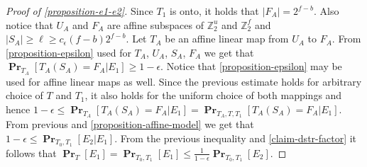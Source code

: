 \documentclass[unicode,review]{siamart1116}
\newcommand{\vecspace}[2]{\mathbb{Z}_{#1}^{#2}}
\newcommand{\binvecspace}[1]{\vecspace{2}{#1}}
\newcommand{\probs}[2]{\operatorname{\mathbf{Pr}}_{{#1}}\left[{#2}\right]}
\numberwithin{theorem}{section}
\begin{document}
\begin{appendix}
\begin{proof}[Proof of \cref{proposition-e1-e2}]
Since $T_1$ is onto, it holds that $|F_A| = 2^{f-b}$.
Also notice that $U_A$ and $F_A$ are affine subspaces of $\binvecspace{u}$ and $\binvecspace{f}$ and $|S_A| \geq \ell \geq c_\epsilon (f - b)2^{f-b}$.
Let $T_A$ be an affine linear map from $U_A$ to $F_A$.
From \cref{proposition-epsilon} used for $T_A$, $U_A$, $S_A$, $F_A$ we get that $\probs{T_A}{T_A(S_A) = F_A | E_1} \geq 1 - \epsilon$.
Notice that \cref{proposition-epsilon} may be used for affine linear maps as well.
Since the previous estimate holds for arbitrary choice of $T$ and $T_1$, it also holds for the uniform choice of both mappings and hence $1 - \epsilon \leq \probs{T_A}{T_A(S_A) = F_A | E_1} = \probs{T_A, T, T_1}{T_A(S_A) = F_A | E_1}$.
From previous and \cref{proposition-affine-model} we get that $1 - \epsilon \leq \probs{T_0, T_1}{E_2 | E_1}$.
From the previous inequality and \cref{claim-dstr-factor} it follows that $\probs{T}{E_1} = \probs{T_0, T_1}{E_1} \leq \frac{1}{1-\epsilon}\probs{T_0, T_1}{E_2}$.
\end{proof}
\end{appendix}
\end{document}
